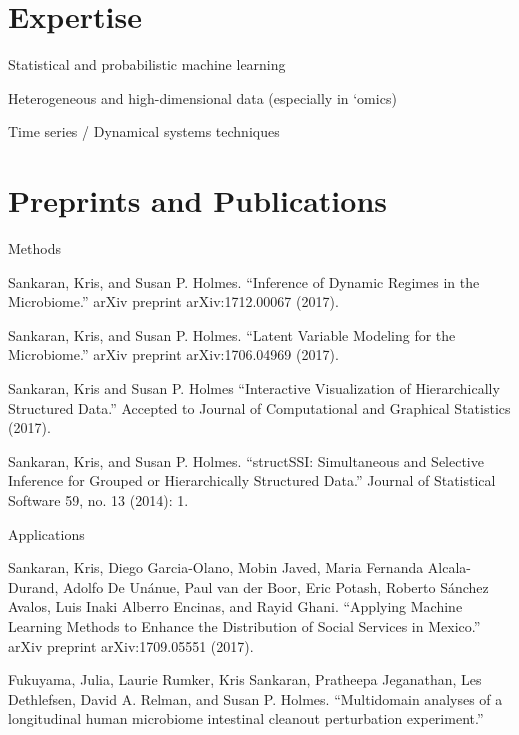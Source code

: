 \documentclass[letterpaper]{article}
\renewenvironment{itemize}{
  \begin{list}{}{
    \setlength{\leftmargin}{1.5em}
  }
}{
  \end{list}
}
\begin{document}
\section*{Expertise}
\begin{itemize}
  \item Statistical and probabilistic machine learning
  \item Heterogeneous and high-dimensional data (especially in `omics)
  \item Time series / Dynamical systems techniques
\end{itemize}
\section*{Preprints and Publications}
\begin{itemize}
  \item Methods
\begin{itemize}
 \item Sankaran, Kris, and Susan P. Holmes. ``Inference of Dynamic Regimes in
   the Microbiome.'' arXiv preprint arXiv:1712.00067 (2017).
\item Sankaran, Kris, and Susan P. Holmes. ``Latent Variable Modeling for the
  Microbiome.'' arXiv preprint arXiv:1706.04969 (2017).
\item Sankaran, Kris and Susan P. Holmes ``Interactive Visualization of
  Hierarchically Structured Data.'' Accepted to Journal of Computational and
  Graphical Statistics (2017).
\item Sankaran, Kris, and Susan P. Holmes. ``structSSI: Simultaneous and Selective
  Inference for Grouped or Hierarchically Structured Data.'' Journal of
  Statistical Software 59, no. 13 (2014): 1.
\end{itemize}
\item Applications
  \begin{itemize}
  \item Sankaran, Kris, Diego Garcia-Olano, Mobin Javed, Maria Fernanda
    Alcala-Durand, Adolfo De Unánue, Paul van der Boor, Eric Potash, Roberto
    S\'anchez Avalos, Luis Inaki Alberro Encinas, and Rayid Ghani. ``Applying
    Machine Learning Methods to Enhance the Distribution of Social Services in
    Mexico.'' arXiv preprint arXiv:1709.05551 (2017).
  \item Fukuyama, Julia, Laurie Rumker, Kris Sankaran, Pratheepa Jeganathan, Les
    Dethlefsen, David A. Relman, and Susan P. Holmes. ``Multidomain analyses of a
    longitudinal human microbiome intestinal cleanout perturbation experiment.''

\end{itemize}
\end{itemize}
\end{document}
